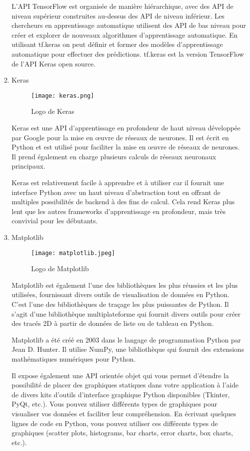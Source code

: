 \begin{enumerate}
        L'API TensorFlow est organisée de manière hiérarchique, avec des API de  niveau supérieur construites au-dessus des API de niveau inférieur. Les chercheurs en apprentissage automatique utilisent des API de bas niveau pour créer et explorer de nouveaux algorithmes d'apprentissage automatique. En utilisant tf.keras on peut définir et former des modèles d'apprentissage automatique  pour effectuer des prédictions. tf.keras est la version TensorFlow de l'API Keras open source.

        \bfseries
        \item Keras
        \begin{figure}[H]
            \centering
            \texttt{[image: keras.png]}
            \caption{Logo de Keras}\label{fig:keras}
        \end{figure}
        \normalfont
        Keras est une API d'apprentissage en profondeur de haut niveau développée par Google pour la mise en œuvre de réseaux de neurones. Il est écrit en Python et est utilisé pour faciliter la mise en œuvre de réseaux de neurones. Il prend également en charge plusieurs calculs de  réseaux neuronaux principaux. 
        
        Keras est relativement facile à apprendre et à utiliser car il fournit une interface Python avec un haut niveau d'abstraction tout en offrant de multiples possibilités de backend à des fins de calcul. Cela rend Keras plus lent que les autres frameworks d'apprentissage en profondeur, mais très convivial pour les débutants.

        \bfseries
        \item Matplotlib
        \begin{figure}[H]
            \centering
            \texttt{[image: matplotlib.jpeg]}
            \caption{Logo de Matplotlib}\label{fig:matplotlib}
        \end{figure}
        \normalfont
        Matplotlib est également l'une des bibliothèques les plus réussies et les plus utilisées, fournissant divers outils de visualisation de données en Python. 
        C'est l'une des bibliothèques de traçage les plus puissantes de Python. Il s'agit d'une bibliothèque multiplateforme qui fournit divers outils pour créer des tracés 2D à partir de données de liste ou de tableau en Python. 
        
        Matplotlib a été créé en 2003 dans le langage de programmation Python par Jean D. Hunter. Il utilise NumPy, une bibliothèque qui fournit des extensions mathématiques numériques pour Python. 
        
        Il expose également une API orientée objet qui vous permet d'étendre la possibilité de placer des graphiques statiques dans votre application à l'aide de divers kits d'outils d'interface graphique Python disponibles (Tkinter, PyQt, etc.). 
        Vous pouvez utiliser différents types de graphiques pour visualiser vos données et faciliter leur compréhension. En écrivant quelques lignes de code en Python, vous pouvez utiliser ces différents types de graphiques (scatter plots, histograms, bar charts, error charts, box charts, etc.).

        \bfseries
    \end{enumerate}
